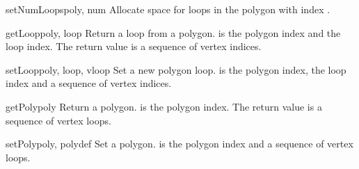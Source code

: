 \begin{methoddesc}{setNumLoops}{poly, num}
Allocate space for  loops in the polygon with index .
\end{methoddesc}

\begin{methoddesc}{getLoop}{poly, loop}
Return a loop from a polygon.  is the polygon index and 
the loop index. The return value is a sequence of vertex indices.
\end{methoddesc}

\begin{methoddesc}{setLoop}{poly, loop, vloop}
Set a new polygon loop.  is the polygon index, 
the loop index and  a sequence of vertex indices.
\end{methoddesc}

\begin{methoddesc}{getPoly}{poly}
Return a polygon.  is the polygon index. The return value
is a sequence of vertex loops.
\end{methoddesc}

\begin{methoddesc}{setPoly}{poly, polydef}
Set a polygon.  is the polygon index and  a sequence
of vertex loops.
\end{methoddesc}




